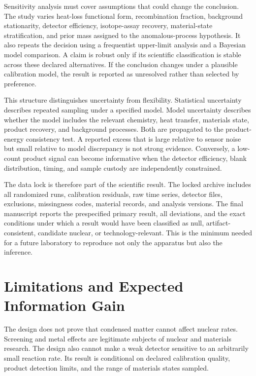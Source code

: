 \documentclass[conference]{IEEEtran}
\begin{document}
Sensitivity analysis must cover assumptions that could change the conclusion. The study varies heat-loss functional form, recombination fraction, background stationarity, detector efficiency, isotope-assay recovery, material-state stratification, and prior mass assigned to the anomalous-process hypothesis. It also repeats the decision using a frequentist upper-limit analysis and a Bayesian model comparison. A claim is robust only if its scientific classification is stable across these declared alternatives. If the conclusion changes under a plausible calibration model, the result is reported as unresolved rather than selected by preference.

This structure distinguishes uncertainty from flexibility. Statistical uncertainty describes repeated sampling under a specified model. Model uncertainty describes whether the model includes the relevant chemistry, heat transfer, materials state, product recovery, and background processes. Both are propagated to the product-energy consistency test. A reported excess that is large relative to sensor noise but small relative to model discrepancy is not strong evidence. Conversely, a low-count product signal can become informative when the detector efficiency, blank distribution, timing, and sample custody are independently constrained.

The data lock is therefore part of the scientific result. The locked archive includes all randomized runs, calibration residuals, raw time series, detector files, exclusions, missingness codes, material records, and analysis versions. The final manuscript reports the prespecified primary result, all deviations, and the exact conditions under which a result would have been classified as null, artifact-consistent, candidate nuclear, or technology-relevant. This is the minimum needed for a future laboratory to reproduce not only the apparatus but also the inference.

\section{Limitations and Expected Information Gain}
\label{sec:limits}
The design does not prove that condensed matter cannot affect nuclear rates. Screening and metal effects are legitimate subjects of nuclear and materials research. The design also cannot make a weak detector sensitive to an arbitrarily small reaction rate. Its result is conditional on declared calibration quality, product detection limits, and the range of materials states sampled.
\end{document}

